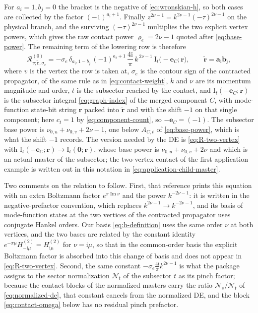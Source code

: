 \documentclass[11pt,a4paper]{article}
\numberwithin{table}{section}
\newcommand{\ii}{\mathrm i}
\newcommand{\cR}{\mathcal R}
\newcommand{\cN}{\mathcal N}
\begin{document}
For $a_i=1,b_j=0$ the bracket is the negative of \eqref{eq:wronskian-h}, so both cases are
collected by the factor $(-1)^{a_i+1}$. Finally $z^{2\nu-1}=k^{2\nu-1}(-\tau)^{2\nu-1}$ on the
physical branch, and the surviving $(-\tau)^{2\nu-1}$ multiplies the two explicit vertex powers,
which gives the raw contact power $\varrho_e=2\nu-1$ quoted after \eqref{eq:base-power}. The remaining
term of the lowering row is therefore
\begin{equation}
  \cR^{(0)}_{v;\tilde{\bm r},\sigma_e}
  =-\sigma_e\,\delta_{a_i,1-b_j}\,(-1)^{a_i+1}\,\frac{4\ii}{\pi}\,
  k^{\,2\nu-1}\ \text{I}_{t}\bigl(-\bm e_C;\bm r\bigr),
  \qquad \tilde{\bm r}=\bm a_{\hat\imath}\bm b_{\hat\jmath},
  \label{eq:R-two-vertex}
\end{equation}
where $v$ is the vertex the row is taken at, $\sigma_e$ is the contour sign of the contracted
propagator, of the same rule as in \eqref{eq:contact-weight}, $k$ and $\nu$ are its momentum magnitude
and order, $t$ is the subsector
reached by the contact, and $\text{I}_{t}(-\bm e_C;\bm r)$ is the subsector integral
\eqref{eq:graph-index} of the merged component $C$, with mode-function state-bit string $\bm r$ packed into
$\tilde{\bm r}$ and with the shift $-1$ on that single component; here $c_t=1$ by
\eqref{eq:component-count}, so $-\bm e_C=(-1)$. The subsector base power is
$\nu_{0,u}+\nu_{0,v}+2\nu-1$, one below $A_{C,t}$ of \eqref{eq:base-power}, which is what the shift
$-1$ records. The version needed by the DE is \eqref{eq:R-two-vertex} with
$\text{I}_{t}(-\bm e_C;\bm r)\to\text{I}_{t}(\bm 0;\bm r)$, whose base power is
$\nu_{0,u}+\nu_{0,v}+2\nu$ and which is an actual master of the subsector; the two-vertex contact
of the first application example is written out in this notation in \eqref{eq:application-child-master}.

Two comments on the relation to \cite{Chen:2024glu} follow. First, that reference prints this
equation with an extra Boltzmann factor $e^{\pi\operatorname{Im}\nu}$ and the
power $k^{-2\nu-1}$: it is written in the negative-prefactor convention, which replaces
$k^{2\nu-1}\to k^{-2\nu-1}$, and its basis of mode-function states at the two vertices of the contracted
propagator uses conjugate Hankel orders. Our basis \eqref{eq:h-definition} uses the same order
$\nu$ at both vertices, and the two bases are related by the constant identity
$e^{-\pi\mu}H^{(2)}_{-\ii\mu}=H^{(2)}_{\ii\mu}$ for $\nu=\ii\mu$, so that in the common-order
basis the explicit Boltzmann factor is absorbed into this change of basis and does not appear
in \eqref{eq:R-two-vertex}. Second, the same constant $-\sigma_e\frac{4\ii}{\pi}k^{2\nu-1}$ is what
the package assigns to the sector normalization $\cN_t$ of the subsector $t$ as its pinch factor; because
the contact blocks of the normalized masters carry the ratio $\cN_s/\cN_t$ of
\eqref{eq:normalized-de}, that constant cancels from the normalized DE, and the block
\eqref{eq:contact-omega} below has no residual pinch prefactor.
\end{document}
